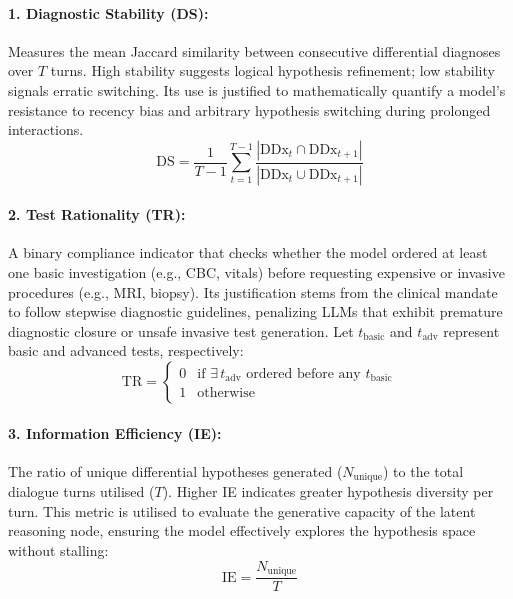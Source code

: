 \paragraph{1. Diagnostic Stability (DS):} Measures the mean Jaccard similarity between consecutive differential diagnoses over $T$ turns. High stability suggests logical hypothesis refinement; low stability signals erratic switching. Its use is justified to mathematically quantify a model's resistance to recency bias and arbitrary hypothesis switching during prolonged interactions.
\begin{equation}
\text{DS} = \frac{1}{T - 1} \sum_{t=1}^{T-1} \frac{|\text{DDx}_t \cap \text{DDx}_{t+1}|}{|\text{DDx}_t \cup \text{DDx}_{t+1}|}
\end{equation}


\paragraph{2. Test Rationality (TR):} A binary compliance indicator that checks whether the model ordered at least one basic investigation (e.g., CBC, vitals) before requesting expensive or invasive procedures (e.g., MRI, biopsy). Its justification stems from the clinical mandate to follow stepwise diagnostic guidelines, penalizing LLMs that exhibit premature diagnostic closure or unsafe invasive test generation. Let $t_{\text{basic}}$ and $t_{\text{adv}}$ represent basic and advanced tests, respectively:
\begin{equation}
\text{TR} = \begin{cases}
0 & \text{if } \exists\, t_{\text{adv}} \text{ ordered before any } t_{\text{basic}} \\
1 & \text{otherwise}
\end{cases}
\end{equation}


\paragraph{3. Information Efficiency (IE):} The ratio of unique differential hypotheses generated ($N_{\text{unique}}$) to the total dialogue turns utilised ($T$). Higher IE indicates greater hypothesis diversity per turn. This metric is utilised to evaluate the generative capacity of the latent reasoning node, ensuring the model effectively explores the hypothesis space without stalling:
\begin{equation}
\text{IE} = \frac{N_{\text{unique}}}{T}
\end{equation}


